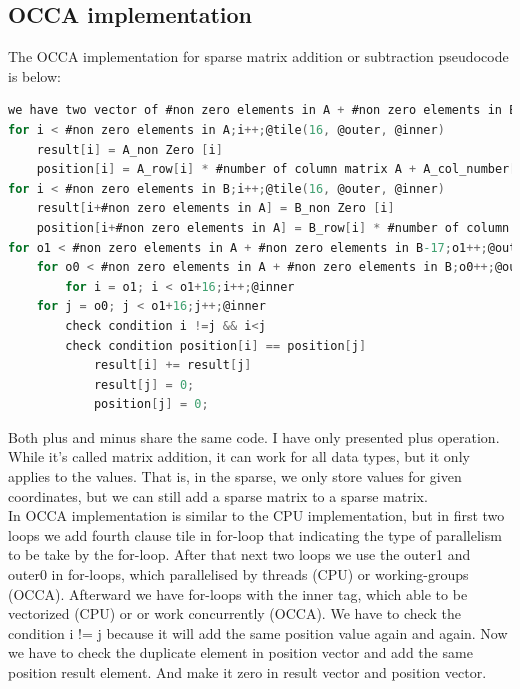 \subsection{OCCA implementation}
The OCCA implementation for sparse matrix addition or subtraction pseudocode is below:
\begin{lstlisting}[language=C, caption=matrix addition (or subtraction) in OCCA]
we have two vector of #non zero elements in A + #non zero elements in B
for i < #non zero elements in A;i++;@tile(16, @outer, @inner)
	result[i] = A_non Zero [i]
	position[i] = A_row[i] * #number of column matrix A + A_col_number[i]
for i < #non zero elements in B;i++;@tile(16, @outer, @inner)
	result[i+#non zero elements in A] = B_non Zero [i]
	position[i+#non zero elements in A] = B_row[i] * #number of column matrix                                    B + B_col_number[i]
for o1 < #non zero elements in A + #non zero elements in B-17;o1++;@outer
	for o0 < #non zero elements in A + #non zero elements in B;o0++;@outer
		for i = o1; i < o1+16;i++;@inner
	for j = o0; j < o1+16;j++;@inner
		check condition i !=j && i<j
		check condition position[i] == position[j]
			result[i] += result[j]
			result[j] = 0;
			position[j] = 0;
\end{lstlisting}
Both plus and minus share the same code. I have only presented plus operation. While it's called matrix addition, it can work for all data types, but it only applies to the values. That is, in the sparse, we only store values for given coordinates, but we can still add a sparse matrix to a sparse matrix.\\
In OCCA implementation is similar to the CPU implementation, but in first two loops we add fourth clause tile in for-loop that indicating the type of parallelism to be take by the for-loop. After that next two loops we use the outer1 and outer0 in for-loops, which parallelised by threads (CPU) or working-groups (OCCA). Afterward we have for-loops with the inner tag, which able to be vectorized (CPU) or or work concurrently (OCCA). We have to check the condition i != j because it will add the same position value again and again. Now we have to check the duplicate element in position vector and add the same position result element. And make it zero in result vector and position vector. 
